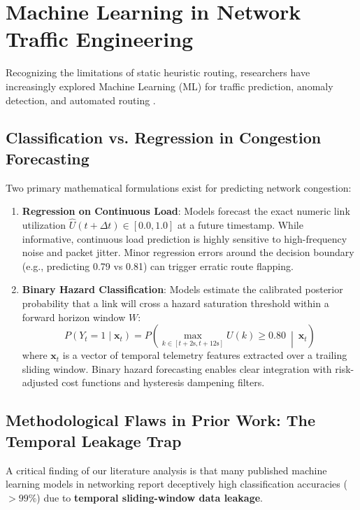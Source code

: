 \section{Machine Learning in Network Traffic Engineering}
Recognizing the limitations of static heuristic routing, researchers have increasingly explored Machine Learning (ML) for traffic prediction, anomaly detection, and automated routing \cite{benson2010network, curtis2011mahout}.

\subsection{Classification vs. Regression in Congestion Forecasting}
Two primary mathematical formulations exist for predicting network congestion:
\begin{enumerate}
  \item \textbf{Regression on Continuous Load}: Models forecast the exact numeric link utilization $\hat{U}(t + \Delta t) \in [0.0, 1.0]$ at a future timestamp. While informative, continuous load prediction is highly sensitive to high-frequency noise and packet jitter. Minor regression errors around the decision boundary (e.g., predicting 0.79 vs 0.81) can trigger erratic route flapping.
  \item \textbf{Binary Hazard Classification}: Models estimate the calibrated posterior probability that a link will cross a hazard saturation threshold within a forward horizon window $W$:
  \begin{equation}
    P(Y_t = 1 \mid \mathbf{x}_t) = P\left(\max_{k \in [t+2\text{s}, t+12\text{s}]} U(k) \ge 0.80 \ \middle|\ \mathbf{x}_t\right)
  \end{equation}
  where $\mathbf{x}_t$ is a vector of temporal telemetry features extracted over a trailing sliding window. Binary hazard forecasting enables clear integration with risk-adjusted cost functions and hysteresis dampening filters.
\end{enumerate}

\subsection{Methodological Flaws in Prior Work: The Temporal Leakage Trap}
A critical finding of our literature analysis is that many published machine learning models in networking report deceptively high classification accuracies ($>99\%$) due to \textbf{temporal sliding-window data leakage}.

